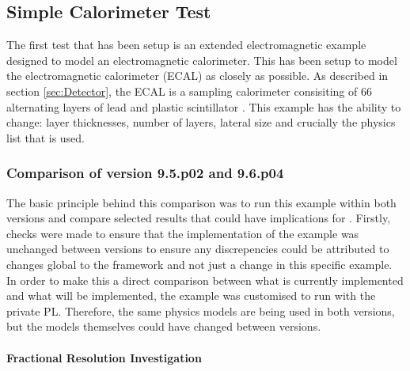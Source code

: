 
\subsection{Simple Calorimeter Test}
\label{sec:Simple Calorimeter Test}
The first test that has been setup is an extended electromagnetic \geant example designed to model an electromagnetic calorimeter.  This has been setup to model the \lhcb electromagnetic calorimeter (ECAL) as closely as possible. As described in section \ref{sec:Detector}, the \lhcb ECAL is a sampling calorimeter consisiting of 66 alternating layers of lead and plastic scintillator \cite{LHCb-TDR-002}.  This example has the ability to change: layer thicknesses, number of layers, lateral size and crucially the physics list that is used.

\subsubsection{Comparison of \geant version 9.5.p02 and 9.6.p04}
The basic principle behind this comparison was to run this example within both \geant versions and compare selected results that could have implications for \lhcb.  Firstly, checks were made to ensure that the implementation of the example was unchanged between versions to ensure any discrepencies could be attributed to changes global to the \geant framework and not just a change in this specific example.  In order to make this a direct comparison between what is currently implemented and what will be implemented, the example was customised to run with the \lhcb private PL.  Therefore, the same physics models are being used in both versions, but the models themselves could have changed between versions.

\paragraph{Fractional Resolution Investigation}
\label{sec:FractionalResolutionInvestigation}

